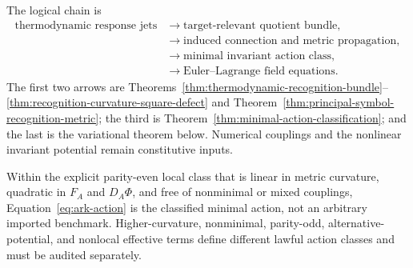 \begin{corollary}
The logical chain is
\[
\begin{aligned}
\text{thermodynamic response jets}
&\longrightarrow \text{target-relevant quotient bundle},\\
&\longrightarrow \text{induced connection and metric propagation},\\
&\longrightarrow \text{minimal invariant action class},\\
&\longrightarrow \text{Euler--Lagrange field equations}.
\end{aligned}
\]
The first two arrows are Theorems~\ref{thm:thermodynamic-recognition-bundle}--\ref{thm:recognition-curvature-square-defect} and Theorem~\ref{thm:principal-symbol-recognition-metric}; the third is Theorem~\ref{thm:minimal-action-classification}; and the last is the variational theorem below.  Numerical couplings and the nonlinear invariant potential remain constitutive inputs.
\end{corollary}

\begin{remark}
Within the explicit parity-even local class that is linear in metric curvature, quadratic in $F_A$ and $D_A\Phi$, and free of nonminimal or mixed couplings, Equation~\eqref{eq:ark-action} is the classified minimal action, not an arbitrary imported benchmark.  Higher-curvature, nonminimal, parity-odd, alternative-potential, and nonlocal effective terms define different lawful action classes and must be audited separately.
\end{remark}

